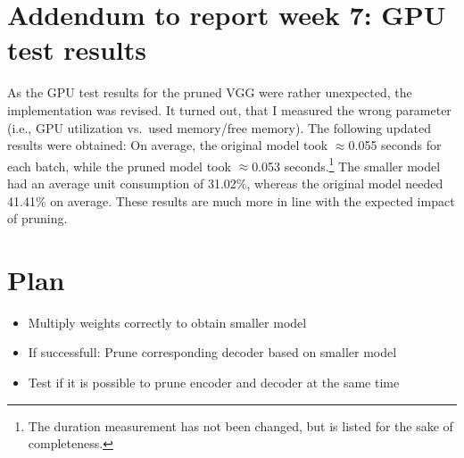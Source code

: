\documentclass[10pt,twocolumn,letterpaper]{article}
\begin{document}
\section{Addendum to report week 7: GPU test results}
As the GPU test results for the pruned VGG were rather unexpected, the implementation was revised.
It turned out, that I measured the wrong parameter (i.e., GPU utilization vs.\ used memory/free memory).
The following updated results were obtained:
On average, the original model took $\approx$0.055 seconds for each batch, while the pruned model took $\approx$0.053 seconds.\footnote{The duration measurement has not been changed, but is listed for the sake of completeness.}
The smaller model had an average unit consumption of 31.02\%, whereas the original model needed 41.41\% on average.
These results are much more in line with the expected impact of pruning.

\section{Plan}
\begin{itemize}
	\item Multiply weights correctly to obtain smaller model
	\item If successfull: Prune corresponding decoder based on smaller model
	\item Test if it is possible to prune encoder and decoder at the same time
\end{itemize}

{\small


}
\end{document}
